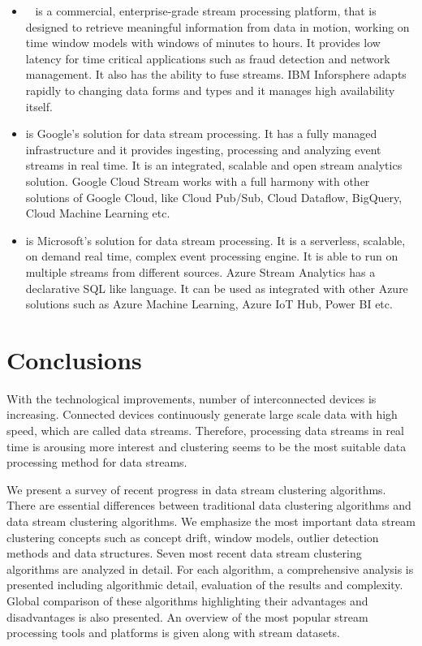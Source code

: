 \documentclass[smallcondensed]{svjour3}     %
\begin{document}
\begin{itemize}
	\item \textbf{\citet{IBMInfosphere}}~\citep{Gedik:2012:MFB:2389474.2389477} is a commercial, enterprise-grade stream processing platform, that is designed to retrieve meaningful information from data in motion, working on time window models with windows of minutes to hours. It provides low latency for time critical applications such as fraud detection and network management. It also has the ability to fuse streams. IBM Inforsphere adapts rapidly to changing data forms and types and it manages high availability itself.
	\item \textbf{\citet{GoogleStream}} is Google's solution for data stream processing. It has a fully managed infrastructure and it provides ingesting, processing and analyzing event streams in real time. It is an integrated, scalable and open stream analytics solution. Google Cloud Stream works with a full harmony with other solutions of Google Cloud, like Cloud Pub/Sub, Cloud Dataflow, BigQuery, Cloud Machine Learning etc.
	\item \textbf{\citet{Azure}} is Microsoft's solution for data stream processing. It is a serverless, scalable, on demand real time, complex event processing engine. It is able to run on multiple streams from different sources. Azure Stream Analytics has a declarative SQL like language. It can be used as integrated with other Azure solutions such as Azure Machine Learning, Azure IoT Hub, Power BI etc.
\end{itemize}


%
\section{Conclusions}
\label{sec:conclusion}
With the technological improvements, number of interconnected devices is increasing. Connected devices continuously generate large scale data with high speed, which are called data streams. Therefore, processing data streams in real time is arousing more interest and clustering seems to be the most suitable data processing method for data streams.

We present a survey of recent progress in data stream clustering algorithms. There are essential differences between traditional data clustering algorithms and data stream clustering algorithms. We emphasize the most important data stream clustering concepts such as concept drift, window models, outlier detection methods and data structures. Seven most recent data stream clustering algorithms are analyzed in detail. For each algorithm, a comprehensive analysis is presented including algorithmic detail, evaluation of the results and complexity. Global comparison of these algorithms highlighting their advantages and disadvantages is also presented.
An overview of the most popular stream processing tools and platforms is given along with stream datasets.
\end{document}

